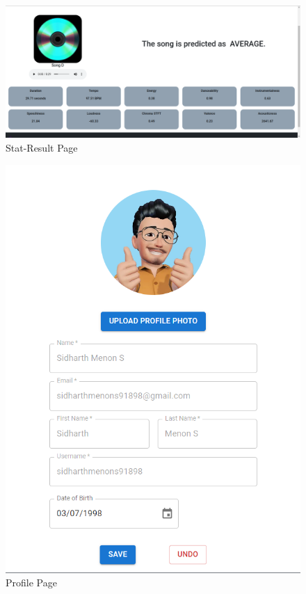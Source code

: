 \documentclass[11pt]{report}
\begin{document}
\begin{figure}[h]
    \centering
    \includegraphics[height=.5\linewidth]{screenshots/10.stat-result.png}
    \caption{Stat-Result Page}
 
\end{figure}

\begin{figure}[h]
    \centering
    \includegraphics[width=.33\linewidth]{screenshots/12.profile.png}
    \caption{Profile Page}
    
\end{figure}
\end{document}
